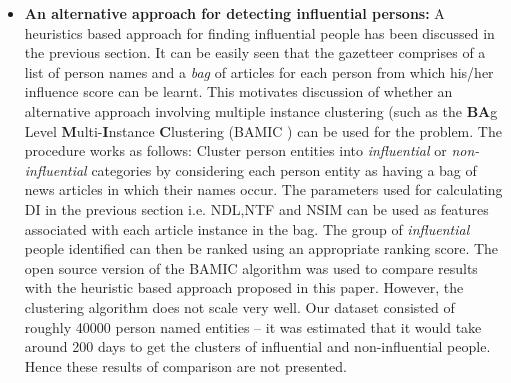 \begin{itemize}
\item \textbf {An alternative approach for detecting influential persons: }
A heuristics based approach for finding influential people has been discussed in the previous section. It can be easily seen that the gazetteer comprises of a list of person names and a \emph{bag} of articles for each person from which his/her influence score can be learnt. This motivates discussion of whether an alternative approach involving multiple instance clustering (such as the \textbf{BA}g Level \textbf{M}ulti-\textbf{I}nstance \textbf{C}lustering (BAMIC \cite{zhang2009multi}) can be used for the problem. The procedure works as follows: 
 Cluster person entities into \emph{influential} or \emph{non-influential} categories by considering each person entity as having a bag of news articles in which their names occur.
The parameters used for calculating DI in the previous section i.e. NDL,NTF and NSIM can be used as features associated with each article instance in the bag. The group of \emph{influential} people identified can then be ranked using an appropriate ranking score.
The open source version of the BAMIC algorithm was used to compare results with the heuristic based approach proposed in this paper. However, the clustering algorithm does not scale very well. Our dataset consisted of roughly 40000 person named entities -- it was estimated that it would take around 200 days to get the clusters of influential and non-influential people.  Hence these results of comparison are not presented. 
\end{itemize}